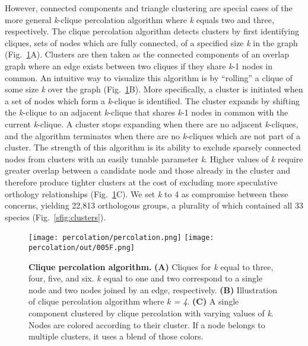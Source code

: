 However, connected components and triangle clustering are special cases of the more general \textit{k}-clique percolation algorithm where \textit{k} equals two and three, respectively. The clique percolation algorithm detects clusters by first identifying cliques, sets of nodes which are fully connected, of a specified size \textit{k} in the graph (Fig.~\ref{fig:percolation}A). Clusters are then taken as the connected components of an overlap graph where an edge exists between two cliques if they share \textit{k}-1 nodes in common. An intuitive way to visualize this algorithm is by “rolling” a clique of some size \textit{k} over the graph (Fig.~\ref{fig:percolation}B). More specifically, a cluster is initiated when a set of nodes which form a \textit{k}-clique is identified. The cluster expands by shifting the \textit{k}-clique to an adjacent \textit{k}-clique that shares \textit{k}-1 nodes in common with the current \textit{k}-clique. A cluster stops expanding when there are no adjacent \textit{k}-cliques, and the algorithm terminates when there are no \textit{k}-cliques which are not part of a cluster. The strength of this algorithm is its ability to exclude sparsely connected nodes from clusters with an easily tunable parameter \textit{k}. Higher values of \textit{k} require greater overlap between a candidate node and those already in the cluster and therefore produce tighter clusters at the cost of excluding more speculative orthology relationships (Fig.~\ref{fig:percolation}C). We set \textit{k} to 4 as compromise between these concerns, yielding 22,813 orthologous groups, a plurality of which contained all 33 species (Fig.~\ref{sfig:clusters}).

\begin{figure}[h!]
\texttt{[image: percolation/percolation.png]}
\texttt{[image: percolation/out/005F.png]}
\centering
\caption{\textbf{Clique percolation algorithm.}
\textbf{(A)} Cliques for \textit{k} equal to three, four, five, and six. \textit{k} equal to one and two correspond to a single node and two nodes joined by an edge, respectively. \textbf{(B)} Illustration of clique percolation algorithm where \textit{k = 4}. \textbf{(C)} A single component clustered by clique percolation with varying values of \textit{k}. Nodes are colored according to their cluster. If a node belongs to multiple clusters, it uses a blend of those colors.}
\label{fig:percolation}
\end{figure}

